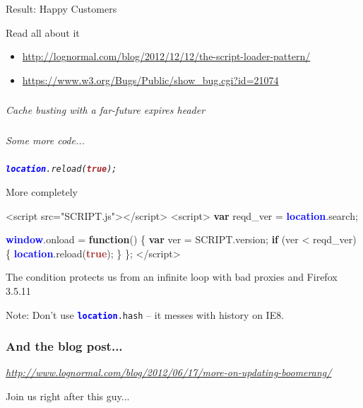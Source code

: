 \documentclass{beamer}
\newcommand{\innersplash}[1]{
  \begin{center}
    \Large \textrm{\textit{ #1 } }
  \end{center}
}
\newcommand{\splashslide}[2][{}]{
  \begin{frame}
  \frametitle{#1}
  \innersplash{#2}
  \end{frame}
}
\def\brown<#1>#2{\textcolor<#1>{brown}{\textbf<#1>{#2}}}
\def\green<#1>#2{\textcolor<#1>{dark-green}{\textbf<#1>{#2}}}
\def\blue<#1>#2{\textcolor<#1>{blue}{\textbf<#1>{#2}}}
\begin{document}
\begin{frame}{Result: Happy Customers}
\end{frame}

\begin{frame}{Read all about it}
\begin{itemize}
  \item \href{http://www.lognormal.com/blog/2012/12/12/the-script-loader-pattern/}{http://lognormal.com/blog/2012/12/12/the-script-loader-pattern/}
  \item \href{https://www.w3.org/Bugs/Public/show_bug.cgi?id=21074}{https://www.w3.org/Bugs/Public/show\_bug.cgi?id=21074}
\end{itemize}
\end{frame}


\splashslide{Cache busting with a far-future expires header}

\splashslide{Some more code...}

\splashslide{\texttt{\blue<1>{location}.reload(\brown<1>{true});}}

\begin{frame}[fragile]{More completely}
\begin{semiverbatim}
<script src="SCRIPT.js"></script>
<script>
\green<1>{var} reqd\_ver = \blue<1>{location}.search;

\blue<1>{window}.onload = \green<1>{function}() \{
    \green<1>{var} ver = SCRIPT.version;
    \green<1>{if} (ver < reqd\_ver) \{
        \blue<1>{location}.reload(\brown<1>{true});
    \}
\};
</script>
\end{semiverbatim}

The condition protects us from an infinite loop with bad proxies and Firefox 3.5.11

\small Note: Don't use \texttt{\blue<1>{location}.hash} -- it messes with history on IE8.
\end{frame}

\splashslide[And the blog post...]{\href{http://www.lognormal.com/blog/2012/06/17/more-on-updating-boomerang/}{http://www.lognormal.com/blog/2012/06/17/more-on-updating-boomerang/}}

\begin{frame}{Join us right after this guy...}
\end{frame}
\end{document}
